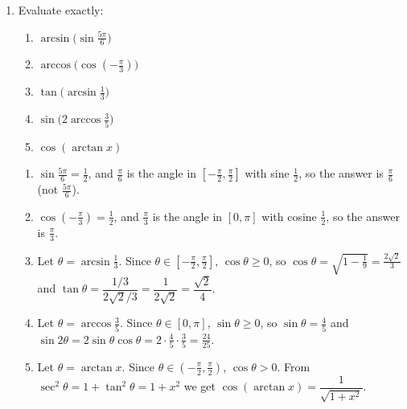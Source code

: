 \documentclass[12pt,letterpaper]{article}
\begin{document}
\begin{enumerate}[label=\textbf{\arabic*.},leftmargin=2em,itemsep=1.25em]
    \begin{solution}
      Let $f(x)=\arcsin x+\arccos x$. For $-1<x<1$,
      \[
        f'(x)=\frac{1}{\sqrt{1-x^2}}-\frac{1}{\sqrt{1-x^2}}=0,
      \]
      so $f$ is constant on $(-1,1)$. Since $f(0)=0+\frac\pi2=\frac\pi2$, we
      get $f(x)=\frac\pi2$ for $-1<x<1$. At the endpoints,
      $f(1)=\frac\pi2+0=\frac\pi2$ and $f(-1)=-\frac\pi2+\pi=\frac\pi2$.
      (Alternatively, $f$ is continuous on $[-1,1]$, so the endpoint values
      follow from the interior values.)
    \end{solution}

  \item Evaluate exactly:
    \begin{enumerate}[label=(\alph*)]
      \item $\arcsin\bigl(\sin\frac{5\pi}{6}\bigr)$
      \item $\arccos\bigl(\cos(-\frac{\pi}{3})\bigr)$
      \item $\tan\bigl(\arcsin\frac13\bigr)$
      \item $\sin\bigl(2\arccos\frac35\bigr)$
      \item $\cos(\arctan x)$
    \end{enumerate}

    \begin{solution}
      \begin{enumerate}[label=(\alph*)]
        \item $\sin\frac{5\pi}{6}=\frac12$, and $\frac\pi6$ is the angle in
          $[-\frac\pi2,\frac\pi2]$ with sine $\frac12$, so the answer is
          $\frac\pi6$ (not $\frac{5\pi}{6}$).
        \item $\cos(-\frac\pi3)=\frac12$, and $\frac\pi3$ is the angle in
          $[0,\pi]$ with cosine $\frac12$, so the answer is $\frac\pi3$.
        \item Let $\theta=\arcsin\frac13$. Since
          $\theta\in[-\frac\pi2,\frac\pi2]$, $\cos\theta\ge0$, so
          $\cos\theta=\sqrt{1-\frac19}=\frac{2\sqrt2}{3}$ and
          $\tan\theta=\dfrac{1/3}{2\sqrt2/3}=\dfrac{1}{2\sqrt2}=\dfrac{\sqrt2}{4}$.
        \item Let $\theta=\arccos\frac35$. Since $\theta\in[0,\pi]$,
          $\sin\theta\ge0$, so $\sin\theta=\frac45$ and
          $\sin2\theta=2\sin\theta\cos\theta=2\cdot\frac45\cdot\frac35
          =\frac{24}{25}$.
        \item Let $\theta=\arctan x$. Since
          $\theta\in(-\frac\pi2,\frac\pi2)$, $\cos\theta>0$. From
          $\sec^2\theta=1+\tan^2\theta=1+x^2$ we get
          $\cos(\arctan x)=\dfrac{1}{\sqrt{1+x^2}}$.
      \end{enumerate}
    \end{solution}


\end{enumerate}
\end{document}
